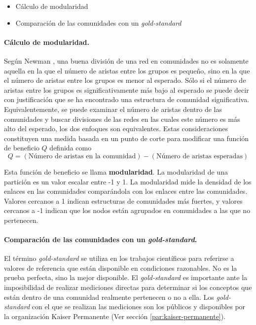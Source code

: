 \begin{itemize}
\item Cálculo de modularidad
\item Comparación de las comunidades con un \textit{gold-standard }
\end{itemize}

\paragraph{Cálculo de modularidad.}
 
Según Newman \cite{Newman2006FindingMatrices.}, una buena división de una red en comunidades no es solamente aquella en la que el número de aristas  entre los grupos es pequeño, sino en la que el número de aristas entre los grupos es menor al esperado. Sólo si el número de aristas entre los grupos es significativamente más bajo al esperado se puede decir con justificación que se ha encontrado una estructura de comunidad significativa. Equivalentemente, se puede examinar el número de aristas dentro de las comunidades y buscar divisiones de las redes en las cuales este número es más alto del esperado, los dos enfoques son equivalentes. Estas consideraciones constituyen una medida basada en un punto de corte para modificar una función de beneficio $Q$ definida como
\begin{equation}
Q =  (\text{Número de aristas en la comunidad}) -  (\text{Número de aristas esperadas})
\end{equation} 

Esta función de beneficio se llama \textbf{modularidad}. La modularidad de una partición es un valor escalar entre -1 y 1. La modularidad mide la densidad de los enlaces en las comunidades comparándola con los enlaces entre las comunidades\cite{Blondel2008FastNetworks}. Valores cercanos a 1 indican estructuras de comunidades más fuertes, y valores cercanos a -1 indican que los nodos están agrupados en comunidades a las que no pertenecen\cite{Tang2010}.

\paragraph{Comparación de las comunidades con un \textit{gold-standard}.}
\label{par:cubrimiento}

El término \textit{gold-standard} \cite{Versi1992GoldTerm.} se utiliza en los trabajos científicos para referirse a valores de referencia que están disponible en condiciones razonables. No es la prueba perfecta, sino la mejor disponible. El \textit{gold-standard} es importante ante la imposibilidad de realizar mediciones directas para determinar si los conceptos que están dentro de una comunidad realmente pertenecen o no a ella. Los \textit{gold-standard} con el que se realizan las mediciones son los públicos y disponibles por la organización Kaiser Permanente (Ver sección \ref{par:kaiser-permanente}).

